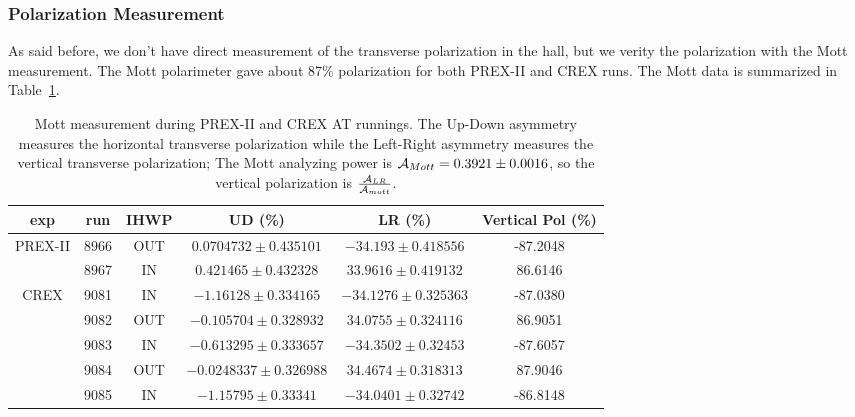 \subsubsection{Polarization Measurement}
As said before, we don't have direct measurement of the transverse polarization
in the hall, but we verity the polarization with the Mott measurement.
The Mott polarimeter gave about 87\% polarization for both PREX-II and CREX runs.
The Mott data is summarized in Table~\ref{tab:AT_Mott}.
\begin{table}[!h]
    \begin{tabular}{c c c | c c | c}
	\hline
	exp & run & IHWP  & UD (\%)	& LR (\%)   & Vertical Pol (\%)	\\
	\hline
	\multirow{2}{*}{PREX-II}
	    & 8966  & OUT   & $0.0704732 \pm 0.435101$	& $-34.193 \pm 0.418556$	& -87.2048  \\
	    & 8967  & IN    & $0.421465 \pm 0.432328$	& $33.9616 \pm 0.419132$	&  86.6146  \\
	\hline
	\multirow{5}{*}{CREX}    
	    & 9081  & IN    & $-1.16128 \pm 0.334165$   & $-34.1276 \pm 0.325363$	& -87.0380  \\
	    & 9082  & OUT   & $-0.105704 \pm 0.328932$	& $34.0755 \pm 0.324116	$&  86.9051  \\
	    & 9083  & IN    & $-0.613295 \pm 0.333657$	& $-34.3502 \pm 0.32453	$& -87.6057  \\
	    & 9084  & OUT   & $-0.0248337 \pm 0.326988$	& $34.4674 \pm 0.318313	$&  87.9046  \\
	    & 9085  & IN    & $-1.15795 \pm 0.33341 $   & $-34.0401 \pm 0.32742	$& -86.8148  \\
	\hline
    \end{tabular}
    \caption{Mott measurement during PREX-II and CREX AT runnings. The Up-Down
    asymmetry measures the horizontal transverse polarization while the Left-Right
    asymmetry measures the vertical transverse polarization; The Mott analyzing 
    power is $\mathcal{A}_{Mott} = 0.3921 \pm 0.0016$, so the vertical polarization is 
    $\frac{\mathcal{A}_{LR}}{\mathcal{A}_{mott}}$.} 
    \label{tab:AT_Mott}
\end{table}

